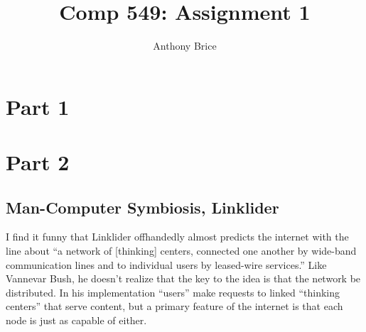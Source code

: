 \message{ !name(hw.tex)}\documentclass{abrice}
\title{Comp 549: Assignment 1}
\author{Anthony Brice}
\begin{document}

\maketitle

\section{Part 1}

\section{Part 2}

\subsection{Man-Computer Symbiosis, Linklider}

I find it funny that Linklider offhandedly almost predicts the internet with the
line about ``a network of [thinking] centers, connected one another by wide-band
communication lines and to individual users by leased-wire services.'' Like
Vannevar Bush, he doesn't realize that the key to the idea is that the network
be distributed. In his implementation ``users'' make requests to linked ``thinking
centers'' that serve content, but a primary feature of the internet is that each
node is just as capable of either.
\end{document}
